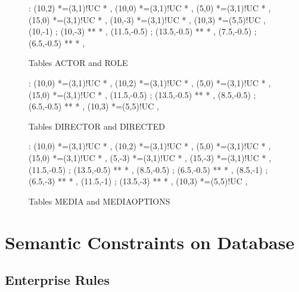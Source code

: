 \documentclass[a4paper,12pt]{article}
\newcommand{\primarykey}[1]{\mbox{{\color{NavyBlue}{$#1$}}}}
\newcommand{\foreignkey}[1]{\underline{#1}}
\begin{document}
\begin{figure}[hp]

\xy<1cm,0cm>:
(10,2) *=(3,1)!UC\txt{\foreignkey{Film ID}} *\frm{-} ,
(10,0) *=(3,1)!UC\txt{\primarykey{Actor ID}} *\frm{-} ,
(5,0) *=(3,1)!UC\txt{\primarykey{Role}} *\frm{-} ,
(15,0) *=(3,1)!UC *\frm{-} ,
(10,-3) *=(3,1)!UC\txt{\primarykey{Actor Name}} *\frm{-} ,
(10,3) *=(5,5)!UC\frm{-} ,
(10,-1) ; (10,-3) **\dir{-}  *\dir{>} ,
(11.5,-0.5) ; (13.5,-0.5) **\dir{-}  *\dir{>} ,
(7.5,-0.5) ; (6.5,-0.5) **\dir{-}  *\dir{>} ,
\endxy

\caption{Tables ACTOR and ROLE}

\end{figure}

\begin{figure}[hp]

\xy<1cm,0cm>:
(10,0) *=(3,1)!UC\txt{\primarykey{Director ID}} *\frm{-} ,
(10,2) *=(3,1)!UC\txt{\foreignkey{Film ID}} *\frm{-} ,
(5,0) *=(3,1)!UC *\frm{-} ,
(15,0) *=(3,1)!UC *\frm{-} ,
(11.5,-0.5) ; (13.5,-0.5) **\dir{-}  *\dir{>} ,
(8.5,-0.5) ; (6.5,-0.5) **\dir{-}  *\dir{>} ,
(10,3) *=(5,5)!UC\frm{-} ,
\endxy

\caption{Tables DIRECTOR and DIRECTED}

\end{figure}

\begin{figure}[hp]

\xy<1cm,0cm>:
(10,0) *=(3,1)!UC\txt{\primarykey{Barcode}} *\frm{-} ,
(10,2) *=(3,1)!UC\txt{\foreignkey{\primarykey{Film ID}}} *\frm{-} ,
(5,0) *=(3,1)!UC *\frm{-} ,
(15,0) *=(3,1)!UC *\frm{-} ,
(5,-3) *=(3,1)!UC *\frm{-} ,
(15,-3) *=(3,1)!UC *\frm{-} ,
(11.5,-0.5) ; (13.5,-0.5) **\dir{-}  *\dir{>} ,
(8.5,-0.5) ; (6.5,-0.5) **\dir{-}  *\dir{>} ,
(8.5,-1) ; (6.5,-3) **\dir{-}  *\dir{>} ,
(11.5,-1) ; (13.5,-3) **\dir{-}  *\dir{>} ,
(10,3) *=(5,5)!UC\frm{-} ,
\endxy

\caption{Tables MEDIA and MEDIAOPTIONS}

\end{figure}

\section{Semantic Constraints on Database}

\subsection{Enterprise Rules}
\end{document}
